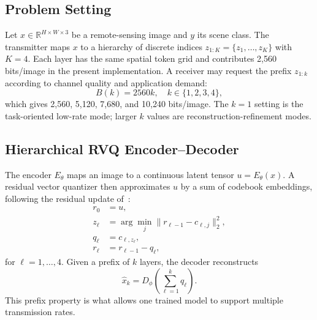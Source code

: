 \documentclass[lettersize,journal]{IEEEtran}
\begin{document}
\subsection{Problem Setting}
Let $x\in\mathbb{R}^{H\times W\times3}$ be a remote-sensing image and $y$ its scene class. The transmitter maps $x$ to a hierarchy of discrete indices $z_{1:K}=\{z_1,\ldots,z_K\}$ with $K=4$. Each layer has the same spatial token grid and contributes 2{,}560 bits/image in the present implementation. A receiver may request the prefix $z_{1:k}$ according to channel quality and application demand:
\begin{equation}
    B(k)=2560k, \quad k\in\{1,2,3,4\},
\end{equation}
which gives 2{,}560, 5{,}120, 7{,}680, and 10{,}240 bits/image. The $k=1$ setting is the task-oriented low-rate mode; larger $k$ values are reconstruction-refinement modes.

\subsection{Hierarchical RVQ Encoder--Decoder}
The encoder $E_\theta$ maps an image to a continuous latent tensor $u=E_\theta(x)$. A residual vector quantizer then approximates $u$ by a sum of codebook embeddings, following the residual update of~\cite{lee2022residual,soundstream}:
\begin{align}
    r_0 &= u, \\
    z_\ell &= \arg\min_j \|r_{\ell-1}-c_{\ell,j}\|_2^2, \\
    q_\ell &= c_{\ell,z_\ell}, \\
    r_\ell &= r_{\ell-1}-q_\ell,
\end{align}
for $\ell=1,\ldots,4$. Given a prefix of $k$ layers, the decoder reconstructs
\begin{equation}
    \hat{x}_k = D_\phi\left(\sum_{\ell=1}^{k} q_\ell\right).
\end{equation}
This prefix property is what allows one trained model to support multiple transmission rates.
\end{document}
